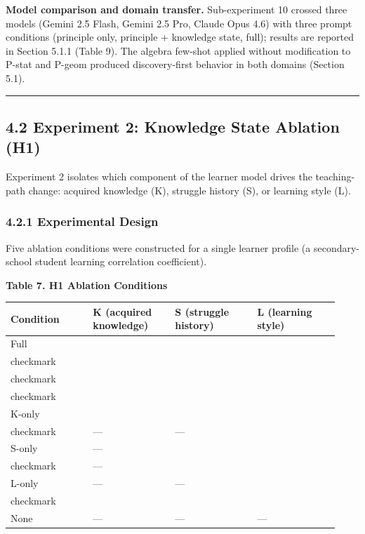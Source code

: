 \documentclass[
]{article}
\newcounter{none} %
\begin{document}
\textbf{Model comparison and domain transfer.} Sub-experiment 10 crossed three models (Gemini 2.5 Flash, Gemini 2.5 Pro, Claude Opus 4.6) with three prompt conditions (principle only, principle + knowledge state, full); results are reported in Section 5.1.1 (Table 9). The algebra few-shot applied without modification to P-stat and P-geom produced discovery-first behavior in both domains (Section 5.1).

\begin{center}\rule{0.5\linewidth}{0.5pt}\end{center}

\subsection{4.2 Experiment 2: Knowledge State Ablation (H1)}\label{42-experiment-2-knowledge-state-ablation-h1}

Experiment 2 isolates which component of the learner model drives the teaching-path change: acquired knowledge (K), struggle history (S), or learning style (L).

\subsubsection{4.2.1 Experimental Design}\label{421-experimental-design}

Five ablation conditions were constructed for a single learner profile (a secondary-school student learning correlation coefficient).

\textbf{Table 7. H1 Ablation Conditions}

{\def\LTcaptype{none} %
\begin{longtable}[]{@{}>{\raggedright\arraybackslash}p{0.233\linewidth}>{\raggedright\arraybackslash}p{0.233\linewidth}>{\raggedright\arraybackslash}p{0.233\linewidth}>{\raggedright\arraybackslash}p{0.233\linewidth}@{}}
\toprule\noalign{}
Condition & K (acquired knowledge) & S (struggle history) & L (learning style) \\
\midrule\noalign{}
\endhead
\bottomrule\noalign{}
\endlastfoot
Full & \\checkmark & \\checkmark & \\checkmark \\
K-only & \\checkmark & --- & --- \\
S-only & --- & \\checkmark & --- \\
L-only & --- & --- & \\checkmark \\
None & --- & --- & --- \\
\end{longtable}
}
\end{document}
